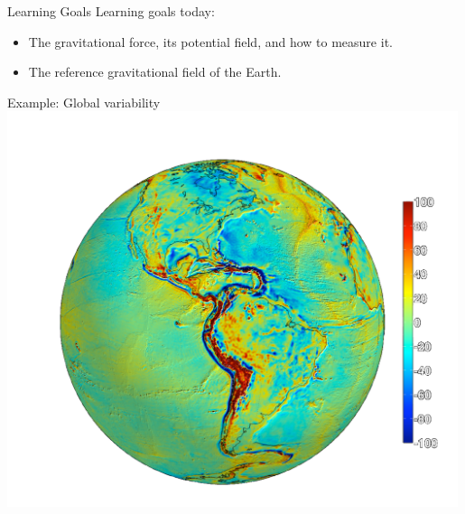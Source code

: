 \begin{frame}
  \begin{PointSix}{Learning Goals}
    \alert{Learning goals today:}
    \begin{itemize}
      \item The gravitational force, its potential field, and how to measure it.
      \item The reference gravitational field of the Earth.
    \end{itemize}
  \end{PointSix}
  \end{frame}

\begin{frame}
  \begin{PointSix}{Example: Global variability}
      \includegraphics[width=0.99\textwidth]{Figures/Gravity/Exported/Grace_JPLCaltect_FODT10_WithoutPeople.png}
  \end{PointSix}
\end{frame}

